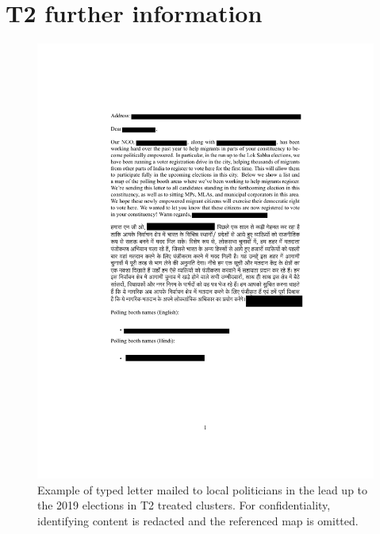 \documentclass[
  11.5pt,
]{article}
\begin{document}
\section{T2 further information}

\begin{figure}

{\centering \includegraphics[width=0.7\linewidth]{pic-t2-letter} 

}

\caption{Example of typed letter mailed to local politicians in the lead up to the 2019 elections in T2 treated clusters. For confidentiality, identifying content is redacted and the referenced map is omitted.}\label{fig:unnamed-chunk-33}
\end{figure}
\end{document}

